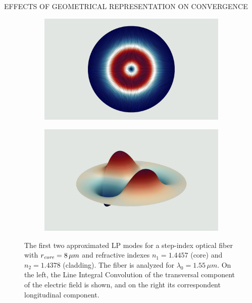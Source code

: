 \documentclass[debug]{beamer} %
\begin{document}
\begin{frame}
\begin{minipage}[t]{0.45\textwidth}
\begin{block}{\boxnumber EFFECTS OF GEOMETRICAL REPRESENTATION ON CONVERGENCE}
\begin{figure}[hb]
\begin{mdframed}[backgroundcolor=bggrey]
					\begin{subfigure}[b]{.4999\textwidth}
						\centering
						\includegraphics[width=1\linewidth]{images/et3posterStepFiber.png}%
					\end{subfigure}\hfill
					\begin{subfigure}[b]{.4999\textwidth}
						\centering
						\includegraphics[width=1\linewidth]{images/ez3posterStepFiber.png}%
					\end{subfigure}
				\end{mdframed}
				\caption{The first two approximated LP modes for a step-index optical fiber with $r_{\text{\emph{core}}}=8\,\mu m$ and refractive indexes $n_1 =1.4457$ (core) and $n_2 =1.4378$ (cladding). The fiber is analyzed for $\lambda_0=1.55\,\mu m$. On the left, the Line Integral Convolution of the transversal component of the electric field is shown, and on the right its correspondent longitudinal component.}
				\label{fig:plot-step}
			\end{figure}
		\end{block}
    \end{minipage}\hspace{2cm}%

\end{frame}
\end{document}
